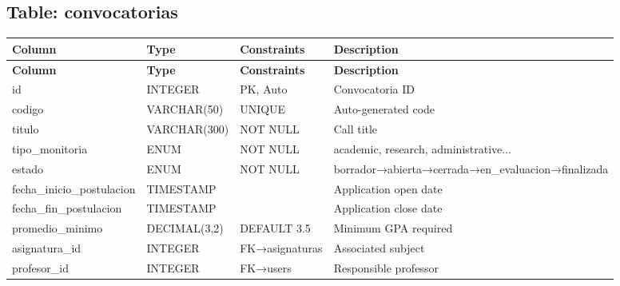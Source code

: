 \documentclass[12pt,a4paper]{report}
\begin{document}
\subsection{Table: convocatorias}
\begin{longtable}{|p{3.5cm}|p{2.5cm}|p{2cm}|p{5.5cm}|}
\hline
\textbf{Column} & \textbf{Type} & \textbf{Constraints} & \textbf{Description} \\
\hline
\endfirsthead
\hline \textbf{Column} & \textbf{Type} & \textbf{Constraints} & \textbf{Description} \\ \hline \endhead
id & INTEGER & PK, Auto & Convocatoria ID \\
\hline
codigo & VARCHAR(50) & UNIQUE & Auto-generated code \\
\hline
titulo & VARCHAR(300) & NOT NULL & Call title \\
\hline
tipo\_monitoria & ENUM & NOT NULL & academic, research, administrative... \\
\hline
estado & ENUM & NOT NULL & borrador→abierta→cerrada→en\_evaluacion→finalizada \\
\hline
fecha\_inicio\_postulacion & TIMESTAMP & & Application open date \\
\hline
fecha\_fin\_postulacion & TIMESTAMP & & Application close date \\
\hline
promedio\_minimo & DECIMAL(3,2) & DEFAULT 3.5 & Minimum GPA required \\
\hline
asignatura\_id & INTEGER & FK→asignaturas & Associated subject \\
\hline
profesor\_id & INTEGER & FK→users & Responsible professor \\
\hline
\end{longtable}
\end{document}
